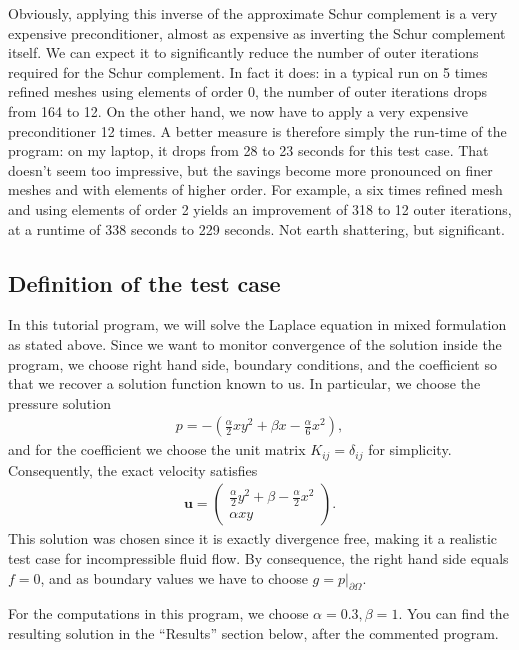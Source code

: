 \documentclass{article}
\renewcommand{\vec}[1]{\mathbf{#1}}
\begin{document}
Obviously, applying this inverse of the approximate Schur complement is a very
expensive preconditioner, almost as expensive as inverting the Schur
complement itself. We can expect it to significantly reduce the number of
outer iterations required for the Schur complement. In fact it does: in a
typical run on 5 times refined meshes using elements of order 0, the number of
outer iterations drops from 164 to 12. On the other hand, we now have to apply
a very expensive preconditioner 12 times. A better measure is therefore simply
the run-time of the program: on my laptop, it drops from 28 to 23 seconds for
this test case. That doesn't seem too impressive, but the savings become more
pronounced on finer meshes and with elements of higher order. For example, a
six times refined mesh and using elements of order 2 yields an improvement of
318 to 12 outer iterations, at a runtime of 338 seconds to 229 seconds. Not
earth shattering, but significant.



\subsection*{Definition of the test case}

In this tutorial program, we will solve the Laplace equation in mixed
formulation as stated above. Since we want to monitor convergence of the
solution inside the program, we choose right hand side, boundary conditions,
and the coefficient so that we recover a solution function known to us. In
particular, we choose the pressure solution
\begin{align*}
  p = -\left(\frac \alpha 2 xy^2 + \beta x - \frac \alpha 6 x^2\right),
\end{align*}
and for the coefficient we choose the unit matrix $K_{ij}=\delta_{ij}$ for
simplicity. Consequently, the exact velocity satisfies
\begin{align*}
  \vec u = 
  \begin{pmatrix}
    \frac \alpha 2 y^2 + \beta - \frac \alpha 2 x^2 \\
    \alpha xy
  \end{pmatrix}.
\end{align*}
This solution was chosen since it is exactly divergence free, making it a
realistic test case for incompressible fluid flow. By consequence, the right
hand side equals $f=0$, and as boundary values we have to choose
$g=p|_{\partial\Omega}$.

For the computations in this program, we choose $\alpha=0.3,\beta=1$. You can
find the resulting solution in the ``Results'' section below, after the
commented program.
\end{document}
